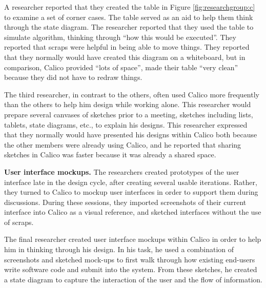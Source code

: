 A researcher reported that they created the table in Figure \ref{fig:researchgroup:c} to examine a set of corner cases. The table served as an aid to help them think through the state diagram. The researcher reported that they used the table to simulate algorithm, thinking through ``how this would be executed''. They reported that scraps were helpful in being able to move things. They reported that they normally would have created this diagram on a whiteboard, but in comparison, Calico provided ``lots of space'', made their table ``very clean'' because they did not have to redraw things. 


The third researcher, in contrast to the others, often used Calico more frequently than the others to help him design while working alone. This researcher would prepare several canvases of sketches prior to a meeting, sketches including lists, tablets, state diagrams, etc., to explain his designs. This researcher expressed that they normally would have presented his designs within Calico both because the other members were already using Calico, and he reported that sharing sketches in Calico was faster because it was already a shared space.

%
%
%

\textbf{User interface mockups. } The researchers created prototypes of the user interface late in the design cycle, after creating several usable iterations. Rather, they turned to Calico to mockup user interfaces in order to support them during discussions. During these sessions, they imported screenshots of their current interface into Calico as a visual reference, and sketched interfaces without the use of scraps.

The final researcher created user interface mockups within Calico in order to help him in thinking through his design. In his task, he used a combination of screenshots and sketched mock-ups to first walk through how existing end-users write software code and submit into the system. From these sketches, he created a state diagram to capture the interaction of the user and the flow of information.

%

